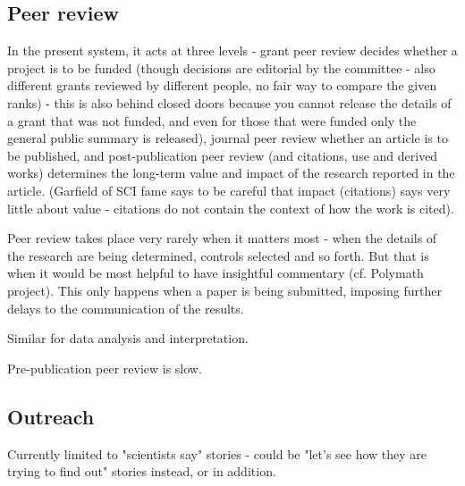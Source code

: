 \documentclass[final,authoryear,3p]{elsarticle-open-drafting}
\begin{document}
\subsection{Peer review}
In the present system, it acts at three levels - grant peer review decides whether a project is to be funded (though decisions are editorial by the committee - also different grants reviewed by different people, no fair way to compare the given ranks) - this is also behind closed doors because you cannot release the details of a grant that was not funded, and even for those that were funded only the general public summary is released), journal peer review  whether an article is to be published, and post-publication peer review (and citations, use and derived works) determines the long-term value and impact of the research reported in the article. (Garfield of SCI fame says to be careful that impact (citations) says very little about value  - citations do not contain the context of how the work is cited). 


Peer review takes place very rarely when it matters most - when the details of the research are being determined, controls selected and so forth. But that is when it would be most helpful to have insightful commentary (cf. Polymath project). This only happens when a paper is being submitted, imposing further delays to the communication of the results. 

Similar for data analysis and interpretation.

Pre-publication peer review is slow.

\subsection{Outreach}
Currently limited to "scientists say" stories - could be "let's see how they are trying to find out" stories instead, or in addition.
\end{document}
